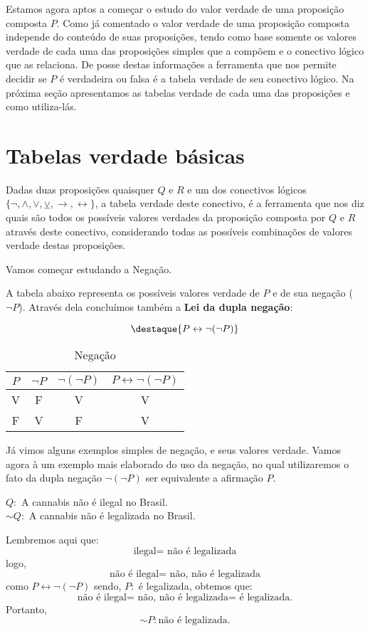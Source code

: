  Estamos agora aptos a começar o estudo do valor verdade de uma proposição composta $P$. Como já comentado o valor verdade de uma proposição composta independe do conteúdo de suas proposições, tendo como base somente os valores verdade de cada uma das proposições simples que a compõem e o conectivo lógico que as relaciona. De posse destas informações a ferramenta que nos permite decidir se $P$ é verdadeira ou falsa é a tabela verdade de seu conectivo lógico. Na próxima seção apresentamos as tabelas verdade de cada uma das proposições e como utiliza-lás.

\section{Tabelas verdade básicas}

 Dadas duas proposições quaisquer $Q$ e $R$ e um dos conectivos lógicos $\{\neg, \land, \lor, \veebar, \rightarrow, \leftrightarrow \}$, a tabela verdade deste conectivo, é a ferramenta que nos diz quais são todos os possíveis valores verdades da proposição composta por $Q$ e $R$ através deste conectivo, considerando todas as possíveis combinações de valores verdade destas proposições.
 
 Vamos começar estudando a Negação.
 
 A tabela abaixo representa os possíveis valores verdade de $P$ e de sua negação ($\neg P$). Através dela concluímos também a \textbf{Lei da dupla negação}: 
 
  \[\destaque{P \leftrightarrow \neg(\neg P)}\]
 
 \begin{table}[H]
 \centering
 \begin{tabular}{|c|c|c|c|} \hline
 \rowcolor{cinza}
 $P$ & $\neg P$ & $\neg (\neg P)$ & $ P \leftrightarrow \neg (\neg P)$\\ \hline
 V & F & V & V \\ \hline
 F & V & F & V \\ \hline
 \end{tabular}
 \caption{Negação}
\end{table}

 Já vimos alguns exemplos simples de negação, e seus valores verdade. Vamos agora à um exemplo mais elaborado do uso da negação, no qual utilizaremos o fato da dupla negação $\neg(\neg P)$ ser equivalente a afirmação $P$. 

 \begin{exem}
 $Q:$ A cannabis não é ilegal no Brasil.\\
 $\sim Q:$ A cannabis não é legalizada no Brasil.
 
 Lembremos aqui que:\\
   \[\text{ilegal= não é legalizada}\] 
 logo, 
   \[\text{não é ilegal= não, não é legalizada}\]
 como $P \leftrightarrow \neg(\neg P)$ sendo, $P:$ é legalizada, obtemos que: 
   \[\text{não é ilegal= não, não é legalizada= é legalizada.}\] 
 Portanto, 
    \[\sim P:\text{não é legalizada.}\]
    
    \fim
 \end{exem}


